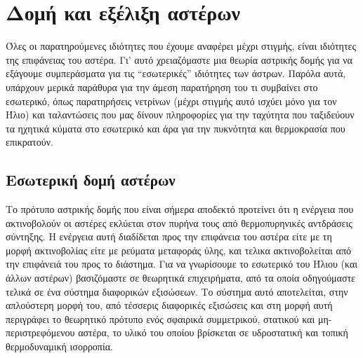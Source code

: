 \chapter{Δομή και εξέλιξη αστέρων}
\label{ch:Chapter5}
{\hypersetup{linkcolor=black, pdfborder=0 0 1}
	\minitoc
}

Όλες οι παρατηρούμενες ιδιότητες που έχουμε αναφέρει μέχρι στιγμής, είναι ιδιότητες της επιφάνειας του αστέρα. Γι' αυτό χρειαζόμαστε μια θεωρία αστρικής δομής για να εξάγουμε συμπεράσματα για τις ``εσωτερικές'' ιδιότητες των άστρων. Παρόλα αυτά, υπάρχουν μερικά παράθυρα για την άμεση παρατήρηση του τι συμβαίνει στο εσωτερικό, όπως παρατηρήσεις νετρίνων (μέχρι στιγμής αυτό ισχύει μόνο για τον Ήλιο) και ταλαντώσεις που μας δίνουν πληροφορίες για την ταχύτητα που ταξιδεύουν τα ηχητικά κύματα στο εσωτερικό και άρα για την πυκνότητα και θερμοκρασία που επικρατούν.
\section{Εσωτερική δομή αστέρων}
Το πρότυπο αστρικής δομής που είναι σήμερα αποδεκτό προτείνει ότι η ενέργεια που ακτινοβολούν οι αστέρες εκλύεται στον πυρήνα τους από θερμοπυρηνικές αντδράσεις σύντηξης. Η ενέργεια αυτή διαδίδεται προς την επιφάνεια του αστέρα είτε με τη μορφή ακτινοβολίας είτε με ρεύματα μεταφοράς ύλης, και τελικα ακτινοβολείται από την επιφάνειά του προς το διάστημα. Για να γνωρίσουμε το εσωτερικό του Ήλιου (και άλλων αστέρων) βασιζόμαστε σε θεωρητικά επιχειρήματα, από τα οποία οδηγούμαστε τελικά σε ένα σύστημα διαφορικών εξισώσεων. Το σύστημα αυτό αποτελείται, στην απλούστερη μορφή του, από τέσσερις διαφορικές εξισώσεις και στη μορφή αυτή περιγράφει το θεωρητικό πρότυπο ενός σφαιρικά συμμετρικού, στατικού και μη-περιστρεφόμενου αστέρα, το υλικό του οποίου βρίσκεται σε υδροστατική και τοπική θερμοδυναμική ισορροπία.
